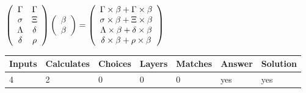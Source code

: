 \documentclass[12pt]{article}
\begin{document}
$  %
 \left( \begin{array}
 {
 c
 c
 }
 \Gamma & 
 \Gamma \\ 
 \sigma & 
                    \Xi \\ 
 \Lambda & 
 \delta \\ 
 \delta & 
 \rho
 \end{array} \right)
 \left( \begin{array}
 {
 c
 }
 \beta \\ 
 \beta
 \end{array} \right)
=
  \left( \begin{array}
 {
 c
 }
 \Gamma \times  \beta   +  \Gamma \times  \beta \\ 
 \sigma \times  \beta   +                     \Xi \times  \beta \\ 
 \Lambda \times  \beta   +  \delta \times  \beta \\ 
 \delta \times  \beta   +  \rho \times  \beta
 \end{array} \right)
$
 
 
 
\noindent{}
 
 

 
 
 
\noindent{}
 
 

 
 
\noindent{}
 
 

 
\vspace{0.3in}
   
   
   
   
\noindent\begin{tabular}{|l|l|l|l|l|l|l|}
 \hline
Inputs & Calculates & Choices & Layers & Matches & Answer & Solution \\ \hline
           4 & 
           2 & 
           0
  & 
           0 & 
           0 & 
  yes & 
  yes 
  \\ \hline
 \end{tabular}
   
   
   
   
\noindent{}
   
\end{document}
